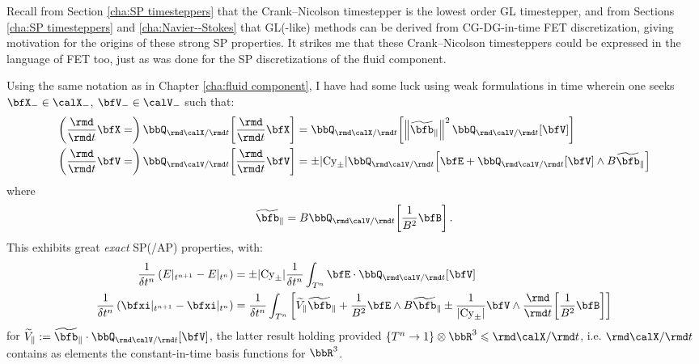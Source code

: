     \begin{remark}
        Recall from Section \ref{cha:SP timesteppers} that the Crank--Nicolson timestepper is the lowest order GL timestepper, and from Sections \ref{cha:SP timesteppers} and \ref{cha:Navier--Stokes} that GL(-like) methods can be derived from CG-DG-in-time FET discretization, giving motivation for the origins of these strong SP properties. It strikes me that these Crank--Nicolson timesteppers could be expressed in the language of FET too, just as was done for the SP discretizations of the fluid component.

        Using the same notation as in Chapter \ref{cha:fluid component}, I have had some luck using weak formulations in time wherein one seeks $\bfX_{-} \in \calX_{-}$, $\bfV_{-} \in \calV_{-}$ such that:
        \begin{align}
            \left(\frac{\rmd}{\rmd t}\bfX
                =\right)  \bbQ_{\rmd\calX/\rmd t}\!\left[\frac{\rmd}{\rmd t}\bfX\right]
                &=  \bbQ_{\rmd\calX/\rmd t}\!\left[\left\|\widetilde{\bfb}_{\parallel}\right\|^{2}\bbQ_{\rmd\calV/\rmd t}[\bfV]\right]  \\
            \left(\frac{\rmd}{\rmd t}\bfV
                =\right)  \bbQ_{\rmd\calV/\rmd t}\!\left[\frac{\rmd}{\rmd t}\bfV\right]
                &=  \pm |\rmCy_{\pm}|\bbQ_{\rmd\calV/\rmd t}\!\left[\bfE + \bbQ_{\rmd\calV/\rmd t}[\bfV]\wedge B\widetilde{\bfb}_{\parallel}\right]
        \end{align}
        where
        \begin{equation}
            \widetilde{\bfb}_{\parallel}  =  B\bbQ_{\rmd\calV/\rmd t}\!\left[\frac{1}{B^{2}}\bfB\right].
        \end{equation}
        This exhibits great \emph{exact} SP(/AP) properties, with:
        \begin{align}
            \frac{1}{\delta t^{n}}\left(E|_{t^{n + 1}} - E|_{t^{n}}\right)
                &=  \pm |\rmCy_{\pm}|\frac{1}{\delta t^{n}}\int_{T^{n}}\bfE\cdot\bbQ_{\rmd\calV/\rmd t}[\bfV]  \\
            \frac{1}{\delta t^{n}}\left(\bfxi|_{t^{n + 1}} - \bfxi|_{t^{n}}\right)
                &=  \frac{1}{\delta t^{n}}\int_{T^{n}}\left[\widetilde{V}_{\parallel}\widetilde{\bfb}_{\parallel}
                + \frac{1}{B^{2}}\bfE\wedge B\widetilde{\bfb}_{\parallel}
                \pm \frac{1}{|\rmCy_{\pm}|}\bfV\wedge\frac{\rmd}{\rmd t}\!\left[\frac{1}{B^{2}}\bfB\right]\right]
        \end{align}
        for $\widetilde{V}_{\parallel}  :=  \widetilde{\bfb}_{\parallel}\cdot\bbQ_{\rmd\calV/\rmd t}[\bfV]$, the latter result holding provided $\{{T^{n}} \rightarrow 1\}\otimes\bbR^{3}  \leqslant  \rmd\calX/\rmd t$, i.e. $\rmd\calX/\rmd t$ contains as elements the constant-in-time basis functions for $\bbR^{3}$.


\end{remark}
